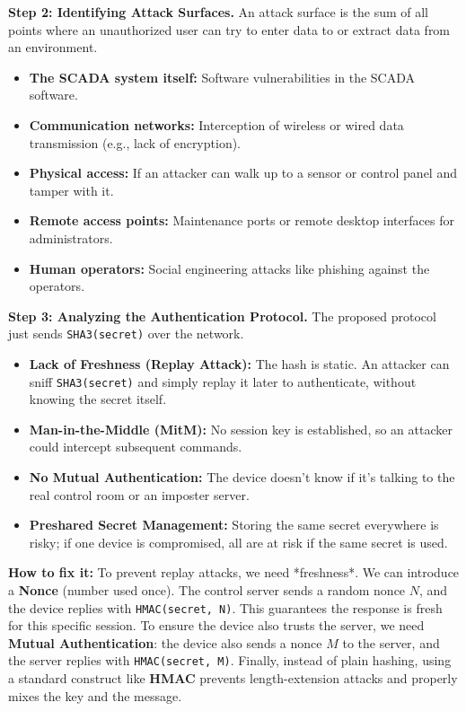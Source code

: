 \documentclass{article}
\begin{document}
\textbf{Step 2: Identifying Attack Surfaces.}
An attack surface is the sum of all points where an unauthorized user can try to enter data to or extract data from an environment.
\begin{itemize}
    \item \textbf{The SCADA system itself:} Software vulnerabilities in the SCADA software.
    \item \textbf{Communication networks:} Interception of wireless or wired data transmission (e.g., lack of encryption).
    \item \textbf{Physical access:} If an attacker can walk up to a sensor or control panel and tamper with it.
    \item \textbf{Remote access points:} Maintenance ports or remote desktop interfaces for administrators.
    \item \textbf{Human operators:} Social engineering attacks like phishing against the operators.

\end{itemize}
\textbf{Step 3: Analyzing the Authentication Protocol.}
The proposed protocol just sends \texttt{SHA3(secret)} over the network.
\begin{itemize}
    \item \textbf{Lack of Freshness (Replay Attack):} The hash is static. An attacker can sniff \texttt{SHA3(secret)} and simply replay it later to authenticate, without knowing the secret itself.
    \item \textbf{Man-in-the-Middle (MitM):} No session key is established, so an attacker could intercept subsequent commands.
    \item \textbf{No Mutual Authentication:} The device doesn't know if it's talking to the real control room or an imposter server.
    \item \textbf{Preshared Secret Management:} Storing the same secret everywhere is risky; if one device is compromised, all are at risk if the same secret is used.

\end{itemize}
\textbf{How to fix it:}
To prevent replay attacks, we need *freshness*. We can introduce a \textbf{Nonce} (number used once). The control server sends a random nonce $N$, and the device replies with \texttt{HMAC(secret, N)}. This guarantees the response is fresh for this specific session. To ensure the device also trusts the server, we need \textbf{Mutual Authentication}: the device also sends a nonce $M$ to the server, and the server replies with \texttt{HMAC(secret, M)}. Finally, instead of plain hashing, using a standard construct like \textbf{HMAC} prevents length-extension attacks and properly mixes the key and the message.
\end{document}
